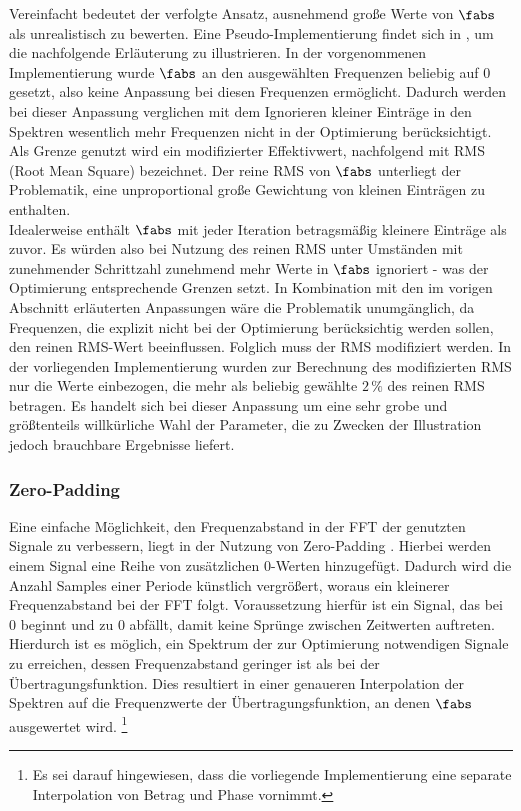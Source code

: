 \documentclass[../Report.tex]{subfiles}
\begin{document}
Vereinfacht bedeutet der verfolgte Ansatz, ausnehmend große Werte von $\fabs$ als unrealistisch zu bewerten. Eine Pseudo-Implementierung findet sich in , um die nachfolgende Erläuterung zu illustrieren. In der vorgenommenen Implementierung wurde $\fabs$ an den ausgewählten Frequenzen beliebig auf $0$ gesetzt, also keine Anpassung bei diesen Frequenzen ermöglicht.
Dadurch werden bei dieser Anpassung verglichen mit dem Ignorieren kleiner Einträge in den Spektren wesentlich mehr Frequenzen nicht in der Optimierung berücksichtigt.
\\
Als Grenze genutzt wird ein modifizierter Effektivwert, nachfolgend mit RMS (Root Mean Square) bezeichnet. 
Der reine RMS von $\fabs$ unterliegt der Problematik, eine unproportional große Gewichtung von kleinen Einträgen zu enthalten.
\\
Idealerweise enthält $\fabs$ mit jeder Iteration betragsmäßig kleinere Einträge als zuvor. Es würden also bei Nutzung des reinen RMS unter Umständen mit zunehmender Schrittzahl zunehmend mehr Werte in $\fabs$ ignoriert - was der Optimierung entsprechende Grenzen setzt. 
In Kombination mit den im vorigen Abschnitt erläuterten Anpassungen wäre die Problematik unumgänglich, da Frequenzen, die explizit nicht bei der Optimierung berücksichtig werden sollen, den reinen RMS-Wert beeinflussen.
Folglich muss der RMS modifiziert werden. In der vorliegenden Implementierung wurden zur Berechnung des modifizierten RMS nur die Werte einbezogen, die mehr als beliebig gewählte $2 \, \%$ des reinen RMS betragen. Es handelt sich bei dieser Anpassung um eine sehr grobe und größtenteils willkürliche Wahl der Parameter, die zu Zwecken der Illustration jedoch brauchbare Ergebnisse liefert.

\subsubsection*{Zero-Padding}
\label{subsubsec:opt.H.zeropadd}

Eine einfache Möglichkeit, den Frequenzabstand in der FFT der genutzten Signale zu verbessern, liegt in der Nutzung von Zero-Padding \cite{zeropad}. Hierbei werden einem Signal eine Reihe von zusätzlichen 0-Werten hinzugefügt. Dadurch wird die Anzahl Samples einer Periode künstlich vergrößert, woraus ein kleinerer Frequenzabstand bei der FFT folgt. Voraussetzung hierfür ist ein Signal, das bei 0 beginnt und zu 0 abfällt, damit keine Sprünge zwischen Zeitwerten auftreten.
Hierdurch ist es möglich, ein Spektrum der zur Optimierung notwendigen Signale zu erreichen, dessen Frequenzabstand geringer ist als bei der Übertragungsfunktion.
Dies resultiert in einer genaueren Interpolation der Spektren auf die Frequenzwerte der Übertragungsfunktion, an denen $\fabs$ ausgewertet wird.
\footnote{Es sei darauf hingewiesen, dass die vorliegende Implementierung eine separate Interpolation von Betrag und Phase vornimmt.}
\end{document}
